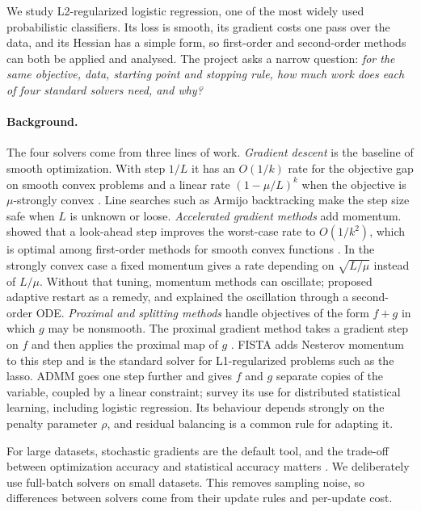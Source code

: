 \documentclass{article}
\begin{document}
We study L2-regularized logistic regression, one of the most widely used probabilistic classifiers. Its loss is smooth, its gradient costs one pass over the data, and its Hessian has a simple form, so first-order and second-order methods can both be applied and analysed. The project asks a narrow question: \emph{for the same objective, data, starting point and stopping rule, how much work does each of four standard solvers need, and why?}

\paragraph{Background.}
The four solvers come from three lines of work.
\emph{Gradient descent} is the baseline of smooth optimization. With step $1/L$ it has an $O(1/k)$ rate for the objective gap on smooth convex problems and a linear rate $(1-\mu/L)^k$ when the objective is $\mu$-strongly convex \citep{nesterov2004introductory}. Line searches such as Armijo backtracking \citep{armijo1966minimization,nocedal2006numerical} make the step size safe when $L$ is unknown or loose.
\emph{Accelerated gradient methods} add momentum. \citet{nesterov1983method} showed that a look-ahead step improves the worst-case rate to $O(1/k^2)$, which is optimal among first-order methods for smooth convex functions \citep{nesterov2004introductory}. In the strongly convex case a fixed momentum gives a rate depending on $\sqrt{L/\mu}$ instead of $L/\mu$. Without that tuning, momentum methods can oscillate; \citet{odonoghue2015adaptive} proposed adaptive restart as a remedy, and \citet{su2016differential} explained the oscillation through a second-order ODE.
\emph{Proximal and splitting methods} handle objectives of the form $f+g$ in which $g$ may be nonsmooth. The proximal gradient method takes a gradient step on $f$ and then applies the proximal map of $g$ \citep{parikh2014proximal}. FISTA \citep{beck2009fista} adds Nesterov momentum to this step and is the standard solver for L1-regularized problems such as the lasso. ADMM \citep{gabay1976dual,glowinski1975approximation} goes one step further and gives $f$ and $g$ separate copies of the variable, coupled by a linear constraint; \citet{boyd2011admm} survey its use for distributed statistical learning, including logistic regression. Its behaviour depends strongly on the penalty parameter $\rho$, and residual balancing \citep{he2000alternating,boyd2011admm} is a common rule for adapting it.

For large datasets, stochastic gradients are the default tool, and the trade-off between optimization accuracy and statistical accuracy matters \citep{bottou2010large,bottou2018optimization}. We deliberately use full-batch solvers on small datasets. This removes sampling noise, so differences between solvers come from their update rules and per-update cost.
\end{document}
